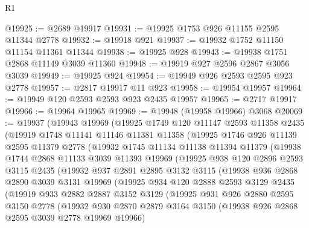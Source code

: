 \begin{lexlean}{R1}
\begin{coremodule}
@19925 := @2689 @19917
@19931 := @19925 @1753 @926 @11155 @2595 @11344 @2778
@19932 := @19918 @921
@19937 := @19932 @1752 @11150 @11154 @11361 @11344
@19938 := @19925 @928
@19943 := @19938 @1751 @2868 @11149 @3039 @11360
@19948 := @19919 @927 @2596 @2867 @3056 @3039
@19949 := @19925 @924
@19954 := @19949 @926 @2593 @2595 @923 @2778
@19957 := @2817 @19917 @11 @923
@19958 := @19954 @19957
@19964 := @19949 @120 @2593 @2593 @923 @2435 @19957
@19965 := @2717 @19917
@19966 := @19964 @19965
@19969 := @19948 (@19958 @19966) @3068
@20069 := @19937
    (@19943
      @19969
      (@19925
        @1749
        @120
        @11147
        @2593
        @11358
        @2435
        (@19919
          @1748
          @11141
          @11146
          @11381
          @11358
          (@19925
            @1746
            @926
            @11139
            @2595
            @11379
            @2778
            (@19932
              @1745
              @11134
              @11138
              @11394
              @11379
              (@19938
                @1744
                @2868
                @11133
                @3039
                @11393
                @19969
                (@19925
                  @938
                  @120
                  @2896
                  @2593
                  @3115
                  @2435
                  (@19932
                    @937
                    @2891
                    @2895
                    @3132
                    @3115
                    (@19938
                      @936
                      @2868
                      @2890
                      @3039
                      @3131
                      @19969
                      (@19925
                        @934
                        @120
                        @2888
                        @2593
                        @3129
                        @2435
                        (@19919
                          @933
                          @2882
                          @2887
                          @3152
                          @3129
                          (@19925
                            @931
                            @926
                            @2880
                            @2595
                            @3150
                            @2778
                            (@19932
                              @930
                              @2870
                              @2879
                              @3164
                              @3150
                              (@19938 @926 @2868 @2595 @3039 @2778 @19969 @19966)

\end{coremodule}
\end{lexlean}
